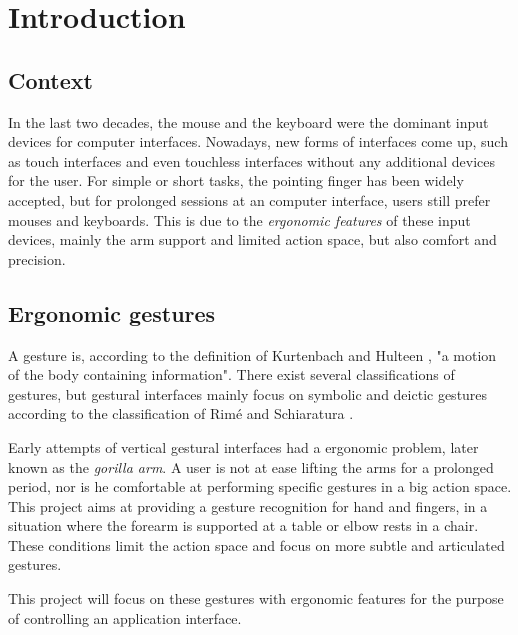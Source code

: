 \chapter{Introduction}
\label{chap:introduction}

\section{Context}
\label{sec:context}
In the last two decades, the mouse and the keyboard were the dominant input devices for computer interfaces. Nowadays, new forms of interfaces come up, such as touch interfaces and even touchless interfaces without any additional devices for the user. For simple or short tasks, the pointing finger has been widely accepted, but for prolonged sessions at an computer interface, users still prefer mouses and keyboards. This is due to the \textit{ergonomic features} of these input devices, mainly the arm support and limited action space, but also comfort and precision.\\


\section{Ergonomic gestures}
\label{sec:ergonomic-gestures}

A gesture is, according to the definition of Kurtenbach and Hulteen \cite{kurtenbach}, "a motion of the body containing information". There exist several classifications of gestures, but gestural interfaces mainly focus on symbolic and deictic gestures according to the classification of Rim\'{e} and Schiaratura \cite{schiaratura}.

Early attempts of vertical gestural interfaces had a ergonomic problem, later known as the \textit{gorilla arm}. A user is not at ease lifting the arms for a prolonged period, nor is he comfortable at performing specific gestures in a big action space. This project aims at providing a gesture recognition for hand and fingers, in a situation where the forearm is supported at a table or elbow rests in a chair. These conditions limit the action space and focus on more subtle and articulated gestures.

This project will focus on these gestures with ergonomic features for the purpose of controlling an application interface.
